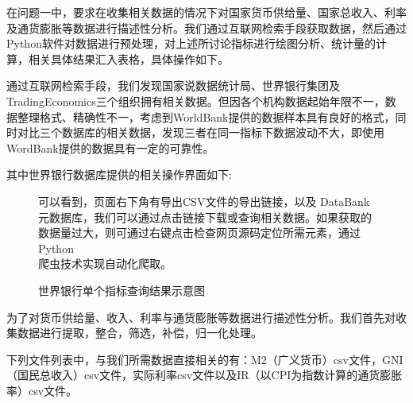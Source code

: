 


在问题一中，要求在收集相关数据的情况下对国家货币供给量、国家总收入、利率及通货膨胀等数据进行描述性分析。我们通过互联网检索手段获取数据，然后通过Python软件对数据进行预处理，对上述所讨论指标进行绘图分析、统计量的计算，相关具体结果汇入表格，具体操作如下。
	

通过互联网检索手段，我们发现国家说数据统计局、世界银行集团及TradingEconomics三个组织拥有相关数据。但因各个机构数据起始年限不一，数据整理格式、精确性不一，考虑到WorldBank提供的数据样本具有良好的格式，同时对比三个数据库的相关数据，发现三者在同一指标下数据波动不大，即使用WordBank提供的数据具有一定的可靠性。

其中世界银行数据库提供的相关操作界面如下:

\begin{center}
\begin{figure}[h]
	\centering
	\begin{minipage}[t]{0.6\textwidth}
		\centering
		\caption{世界银行单个指标查询结果示意图}
		\label{fig:WorldBank}
	\end{minipage}%
	\hspace*{1cm} %
	\begin{minipage}[t]{0.34\textwidth}
		\raggedright %
		\vspace{-5.4cm} %
		\qquad 可以看到，页面右下角有导出CSV文件的导出链接，以及 DataBank 元数据库，我们可以通过点击链接下载或查询相关数据。如果获取的数据量过大，则可通过右键点击检查网页源码定位所需元素，通过 Python \\爬虫技术实现自动化爬取。
	\end{minipage}
\end{figure}
\end{center}
	
为了对货币供给量、收入、利率与通货膨胀等数据进行描述性分析。我们首先对收集数据进行提取，整合，筛选，补偿，归一化处理。

下列文件列表中，与我们所需数据直接相关的有：M2（广义货币）csv文件，GNI（国民总收入）csv文件，实际利率csv文件以及IR（以CPI为指数计算的通货膨胀率）csv文件。

